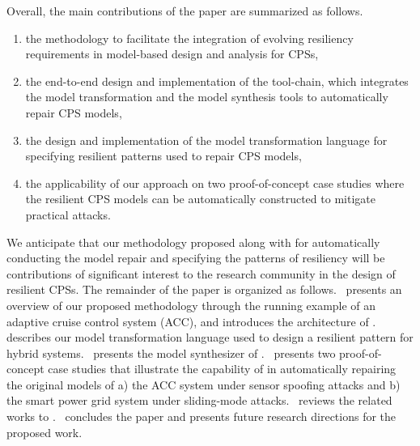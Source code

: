 Overall, the main contributions of the paper are summarized as follows.
%
\begin{enumerate}[leftmargin= 2 em]
\item the methodology to facilitate the integration of evolving resiliency requirements in model-based design and analysis for CPSs,
\item the end-to-end design and implementation of the tool-chain, which integrates the model transformation and the model synthesis tools to automatically repair CPS models,
\item the design and implementation of the model transformation language for specifying resilient patterns used to repair CPS models,
\item the applicability of our approach on two proof-of-concept case studies where the resilient CPS models can be automatically constructed to mitigate practical attacks.
\end{enumerate}
%
We anticipate that our methodology proposed along with \toolreaffirm for automatically conducting the model repair and specifying the patterns of resiliency will be contributions of significant interest to the research community in the design of resilient CPSs.
%
%
The remainder of the paper is organized as follows.~ presents an overview of our proposed methodology through the running example of an adaptive cruise control system (ACC), and introduces the architecture of \toolreaffirm.~ describes our model transformation language used to design a resilient pattern for hybrid systems.~ presents the model synthesizer of \toolreaffirm.~ presents two proof-of-concept case studies that illustrate the capability of \toolreaffirm in automatically repairing the original models of a) the ACC system under sensor spoofing attacks and b) the smart power grid system under sliding-mode attacks.~ reviews the related works to \toolreaffirm.~ concludes the paper and presents future research directions for the proposed work.






